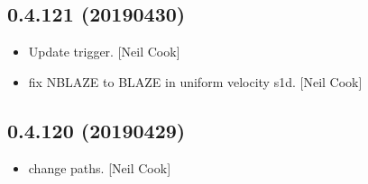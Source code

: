 \documentclass[a4paper,10pt,english]{report}
\begin{document}
\subsection{0.4.121 (2019\sphinxhyphen{}04\sphinxhyphen{}30)}
\label{\detokenize{misc/changelog:id158}}\begin{itemize}
\item {} 
Update trigger. {[}Neil Cook{]}

\item {} 
 \sphinxhyphen{} fix NBLAZE to BLAZE in uniform velocity s1d. {[}Neil
Cook{]}

\end{itemize}


\subsection{0.4.120 (2019\sphinxhyphen{}04\sphinxhyphen{}29)}
\label{\detokenize{misc/changelog:id159}}\begin{itemize}
\item {} 
 \sphinxhyphen{} change paths. {[}Neil Cook{]}

\end{itemize}
\end{document}

